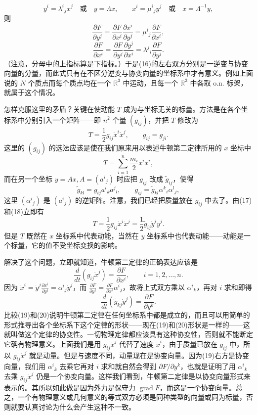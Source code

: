 \[
 y^i=\lambda^i{}_j x^j\quad\text{或}\quad y=\Lambda x,\qquad
 x^i=\mu^i{}_j y^j\quad\text{或}\quad x=\Lambda^{-1}y,
\]
则
\[
 \frac{\partial F}{\partial y^j}
 =\frac{\partial F}{\partial x^i}\frac{\partial x^i}{\partial y^j}
 =\mu^i{}_j\frac{\partial F}{\partial x^i},
\]
\[
 \frac{\partial F}{\partial x^i}
 =\frac{\partial F}{\partial y^j}\frac{\partial y^j}{\partial x^i}
 =\lambda^j{}_i\frac{\partial F}{\partial y^j}.
\]
（注意，分母中的上指标算是下指标。）于是(16)的左右双方分别是一逆变与协变向量的分量，而此式只有在不区分逆变与协变向量的坐标系中才有意义。例如上面说的 $N$ 个质点而每个质点均在一个 $\mathbb R^3$ 中运动，且每一个 $\mathbb R^3$ 中各取 o.n. 标架，就属于这个情况。

怎样克服这里的矛盾？关键在使动能 $T$ 成为与坐标无关的标量。方法是在各个坐标系中分别引入一个矩阵——即 $n^2$ 个量 $(g_{ij})$，并把 $T$ 修改为
\begin{equation}
 T=\frac12 g_{ij}\dot x^i\dot x^j,\qquad g_{ij}=g_{ji}.
 \tag{17}
\end{equation}
这里的 $(g_{ij})$ 的选法应该是使在我们原来用以表述牛顿第二定律所用的 $x$ 坐标中
\[
 T=\sum_{i=1}^n\frac{m_i}{2}\dot x^i\dot x^i,
\]
而在另一个坐标 $y=Ax,A=(a^i{}_j)$ 时应把 $g_{ij}$ 改成 $\widetilde g_{ij}$，使得
\begin{equation}
 \widetilde g_{kl}=g_{ij}a^i{}_k a^j{}_l,
 \qquad
 g_{ij}=\widetilde g_{kl}\alpha^k{}_i\alpha^l{}_j,
 \tag{18}
\end{equation}
这里 $(\alpha^i{}_j)$ 是 $(a^i{}_j)$ 的逆矩阵。注意，我们已经把质量放在 $g_{ij}$ 中去了。由(17)和(18)立即有
\[
 T=\frac12 g_{ij}\dot x^i\dot x^j
 =\frac12\widetilde g_{ij}\dot y^i\dot y^j.
\]
但是 $T$ 既然在 $x$ 坐标系中代表动能，当然在 $y$ 坐标系中也代表动能——动能是一个标量，它的值不受坐标变换的影响。

解决了这个问题，立即就知道，牛顿第二定律的正确表达应该是
\begin{equation}
 \frac{d}{dt}(g_{ij}\dot x^j)=\frac{\partial F}{\partial x^i},
 \qquad i=1,2,\ldots,n.
 \tag{19}
\end{equation}
因为 $\dot x^i=\dot y^j\frac{\partial x^i}{\partial y^j}=\alpha^i{}_j\dot y^j$，而 $\frac{\partial F}{\partial y^j}=\frac{\partial F}{\partial x^i}\alpha^i{}_j$，故将上式双方乘以 $\alpha^i{}_k$，再对 $i$ 求和即得
\begin{equation}
 \frac{d}{dt}(\widetilde g_{kj}\dot y^j)=\frac{\partial F}{\partial y^k}.
 \tag{20}
\end{equation}
比较(19)和(20)说明牛顿第二定律在任何坐标系中都是成立的，而且可以用简单的形式推导出各个坐标系下这个定律的形状——现在(19)和(20)形状是一样的——这就叫做这个定律的协变性。一切物理定律都应该具有这种协变性，否则就不能断定它确有物理意义。上面我们是用 $g_{ij}\dot x^j$ 代替了速度 $\dot x^i$，由于质量已放在 $g_{ij}$ 中，所以 $g_{ij}\dot x^j$ 就是动量。但是与速度不同，动量现在是协变向量。因为(19)右方是协变向量，我们用 $\alpha^i{}_k$ 去乘它再对 $i$ 求和就自然会得到 $\partial F/\partial y^k$，也就是证明了用 $\alpha^i{}_k$ 去乘 $g_{ij}\dot x^j$ 仍是一个协变向量。这样我们看到，牛顿第二定律是以协变向量形式来表示的。其所以如此做是因为外力是保守力 $\operatorname{grad}F$，而这是一个协变向量。总之，一个有物理意义或几何意义的等式双方必须是同种类型的向量或同为标量，否则就要认真讨论为什么会产生这种不一致。

